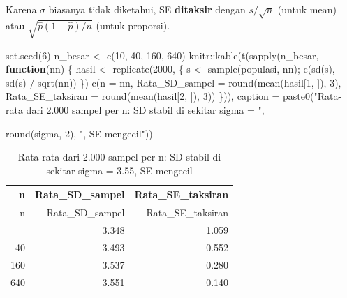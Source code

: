 \documentclass[
  indonesian,
  letterpaper,
]{book}
\newenvironment{Shaded}{\begin{snugshade}}{\end{snugshade}}
\newcommand{\AttributeTok}[1]{\textcolor[rgb]{0.40,0.45,0.13}{#1}}
\newcommand{\ControlFlowTok}[1]{\textcolor[rgb]{0.00,0.23,0.31}{\textbf{#1}}}
\newcommand{\DecValTok}[1]{\textcolor[rgb]{0.68,0.00,0.00}{#1}}
\newcommand{\FunctionTok}[1]{\textcolor[rgb]{0.28,0.35,0.67}{#1}}
\newcommand{\NormalTok}[1]{\textcolor[rgb]{0.00,0.23,0.31}{#1}}
\newcommand{\OtherTok}[1]{\textcolor[rgb]{0.00,0.23,0.31}{#1}}
\newcommand{\SpecialCharTok}[1]{\textcolor[rgb]{0.37,0.37,0.37}{#1}}
\newcommand{\StringTok}[1]{\textcolor[rgb]{0.13,0.47,0.30}{#1}}
\begin{document}
Karena \(\sigma\) biasanya tidak diketahui, SE \textbf{ditaksir} dengan
\(s/\sqrt{n}\) (untuk mean) atau \(\sqrt{\hat{p}(1-\hat{p})/n}\) (untuk
proporsi).

\begin{Shaded}
\begin{Highlighting}[]
\FunctionTok{set.seed}\NormalTok{(}\DecValTok{6}\NormalTok{)}
\NormalTok{n\_besar }\OtherTok{\textless{}{-}} \FunctionTok{c}\NormalTok{(}\DecValTok{10}\NormalTok{, }\DecValTok{40}\NormalTok{, }\DecValTok{160}\NormalTok{, }\DecValTok{640}\NormalTok{)}
\NormalTok{knitr}\SpecialCharTok{::}\FunctionTok{kable}\NormalTok{(}\FunctionTok{t}\NormalTok{(}\FunctionTok{sapply}\NormalTok{(n\_besar, }\ControlFlowTok{function}\NormalTok{(nn) \{}
\NormalTok{hasil }\OtherTok{\textless{}{-}} \FunctionTok{replicate}\NormalTok{(}\DecValTok{2000}\NormalTok{, \{ s }\OtherTok{\textless{}{-}} \FunctionTok{sample}\NormalTok{(populasi, nn); }\FunctionTok{c}\NormalTok{(}\FunctionTok{sd}\NormalTok{(s), }\FunctionTok{sd}\NormalTok{(s) }\SpecialCharTok{/} \FunctionTok{sqrt}\NormalTok{(nn)) \})}
\FunctionTok{c}\NormalTok{(}\AttributeTok{n =}\NormalTok{ nn, }\AttributeTok{Rata\_SD\_sampel =} \FunctionTok{round}\NormalTok{(}\FunctionTok{mean}\NormalTok{(hasil[}\DecValTok{1}\NormalTok{, ]), }\DecValTok{3}\NormalTok{),}
\AttributeTok{Rata\_SE\_taksiran =} \FunctionTok{round}\NormalTok{(}\FunctionTok{mean}\NormalTok{(hasil[}\DecValTok{2}\NormalTok{, ]), }\DecValTok{3}\NormalTok{))}
\NormalTok{\})), }\AttributeTok{caption =} \FunctionTok{paste0}\NormalTok{(}\StringTok{"Rata{-}rata dari 2.000 sampel per n: SD stabil di sekitar sigma = "}\NormalTok{,}

\FunctionTok{round}\NormalTok{(sigma, }\DecValTok{2}\NormalTok{), }\StringTok{", SE mengecil"}\NormalTok{))}
\end{Highlighting}
\end{Shaded}

\begin{longtable}[]{@{}rrr@{}}
\caption{Rata-rata dari 2.000 sampel per n: SD stabil di sekitar sigma =
3.55, SE mengecil}\tabularnewline
\toprule\noalign{}
n & Rata\_SD\_sampel & Rata\_SE\_taksiran \\
\midrule\noalign{}
\endfirsthead
\toprule\noalign{}
n & Rata\_SD\_sampel & Rata\_SE\_taksiran \\
\midrule\noalign{}
\endhead
\bottomrule\noalign{}
\endlastfoot
10 & 3.348 & 1.059 \\
40 & 3.493 & 0.552 \\
160 & 3.537 & 0.280 \\
640 & 3.551 & 0.140 \\
\end{longtable}
\end{document}
